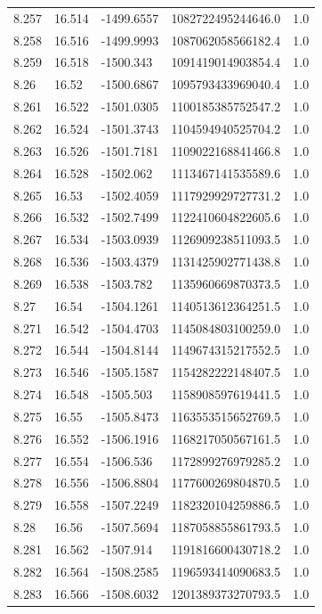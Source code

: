 \begin{tabular}{lllll}
8.257 & 16.514 & -1499.6557 & 1082722495244646.0 & 1.0 \\
8.258 & 16.516 & -1499.9993 & 1087062058566182.4 & 1.0 \\
8.259 & 16.518 & -1500.343 & 1091419014903854.4 & 1.0 \\
8.26 & 16.52 & -1500.6867 & 1095793433969040.4 & 1.0 \\
8.261 & 16.522 & -1501.0305 & 1100185385752547.2 & 1.0 \\
8.262 & 16.524 & -1501.3743 & 1104594940525704.2 & 1.0 \\
8.263 & 16.526 & -1501.7181 & 1109022168841466.8 & 1.0 \\
8.264 & 16.528 & -1502.062 & 1113467141535589.6 & 1.0 \\
8.265 & 16.53 & -1502.4059 & 1117929929727731.2 & 1.0 \\
8.266 & 16.532 & -1502.7499 & 1122410604822605.6 & 1.0 \\
8.267 & 16.534 & -1503.0939 & 1126909238511093.5 & 1.0 \\
8.268 & 16.536 & -1503.4379 & 1131425902771438.8 & 1.0 \\
8.269 & 16.538 & -1503.782 & 1135960669870373.5 & 1.0 \\
8.27 & 16.54 & -1504.1261 & 1140513612364251.5 & 1.0 \\
8.271 & 16.542 & -1504.4703 & 1145084803100259.0 & 1.0 \\
8.272 & 16.544 & -1504.8144 & 1149674315217552.5 & 1.0 \\
8.273 & 16.546 & -1505.1587 & 1154282222148407.5 & 1.0 \\
8.274 & 16.548 & -1505.503 & 1158908597619441.5 & 1.0 \\
8.275 & 16.55 & -1505.8473 & 1163553515652769.5 & 1.0 \\
8.276 & 16.552 & -1506.1916 & 1168217050567161.5 & 1.0 \\
8.277 & 16.554 & -1506.536 & 1172899276979285.2 & 1.0 \\
8.278 & 16.556 & -1506.8804 & 1177600269804870.5 & 1.0 \\
8.279 & 16.558 & -1507.2249 & 1182320104259886.5 & 1.0 \\
8.28 & 16.56 & -1507.5694 & 1187058855861793.5 & 1.0 \\
8.281 & 16.562 & -1507.914 & 1191816600430718.2 & 1.0 \\
8.282 & 16.564 & -1508.2585 & 1196593414090683.5 & 1.0 \\
8.283 & 16.566 & -1508.6032 & 1201389373270793.5 & 1.0 \\

\end{tabular}
